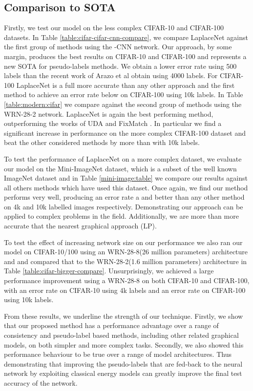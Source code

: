 \documentclass[journal]{IEEEtran}
\begin{document}
\subsection{Comparison to SOTA}
Firstly, we test our model on the less complex CIFAR-10 and CIFAR-100 datasets. In Table \ref{table:cifar-cifar-cnn-compare}, we compare LaplaceNet against the first group of methods using the -CNN network. Our approach, by some margin, produces the best results on CIFAR-10 and CIFAR-100 and represents a new SOTA for pseudo-labels methods. We obtain a lower error rate using 500 labels than the recent work of Arazo et al \cite{arazo2019pseudo} obtain using 4000 labels. For CIFAR-100 LaplaceNet is a full  more accurate than any other approach and the first method to achieve an error rate below  on CIFAR-100 using 10k labels. In Table \ref{table:modern:cifar} we compare against the second group of methods using the WRN-28-2 network. LaplaceNet is again the best performing method, outperforming the works of UDA \cite{xie2019unsupervised} and FixMatch \cite{sohn2020fixmatch}. In particular we find a significant increase in performance on the more complex CIFAR-100 dataset and beat the other considered methods by more than  with 10k labels.

To test the performance of LaplaceNet on a more complex dataset, we evaluate our model on the Mini-ImageNet dataset, which is a subset of the well known ImageNet dataset and in Table \ref{mini-image:table} we compare our results against all others methods which have used this dataset. Once again, we find our method performs very well, producing an error rate a  and  better than any other method on 4k and 10k labelled images respectively. Demonstrating our approach can be applied to complex problems in the field. Additionally, we are more than  more accurate that the nearest graphical approach (LP).

To test the effect of increasing network size on our performance we also ran our model on CIFAR-10/100 using an WRN-28-8(26 million parameters) architecture and and compared that to the WRN-28-2(1.6 million parameters) architecture in Table \ref{table:cifar-bigger-compare}. Unsurprisingly, we achieved a large performance improvement using a WRN-28-8 on both CIFAR-10 and CIFAR-100, with an  error rate on CIFAR-10 using 4k labels and an  error rate on CIFAR-100 using 10k labels. 

From these results, we underline the strength  of our technique. Firstly,  we show that our proposed method has a performance advantage over a range of consistency and pseudo-label based methods, including other related graphical models, on both simpler and more complex tasks. Secondly, we also showed this performance behaviour to be true over a range of model architectures. Thus demonstrating that improving the pseudo-labels that are fed-back to the neural network by exploiting classical energy models can greatly improve the final test accuracy of the network.
\end{document}
